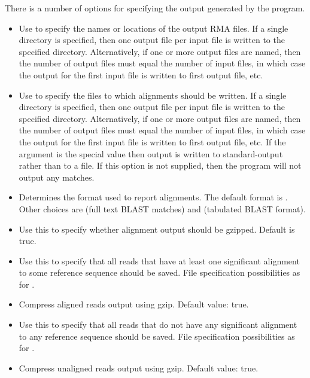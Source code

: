 \documentclass[11pt]{article}
\begin{document}
There is a number of options for specifying the output generated by the program.
\begin{itemize}
\setlength{\itemindent}{30pt}
\item[\itt{--output}]   Use to specify the names or locations of the output RMA files.
	If a single directory is specified, then one output file
per input file is written to the specified directory. Alternatively, if one or more output files are named, then
the number of output files must equal the number of input files, in which case the output for the first
input file is written to first output file, etc. 
\item[\itt{--alignments}]   Use to specify the files to which alignments should be written.
	If a single directory is specified, then one output file
per input file is written to the specified directory. Alternatively, if one or more output files are named, then
the number of output files must equal the number of input files, in which case the output for the first
input file is written to first output file, etc. If the argument is the special value  then output is written
to standard-output rather than to a file. If this option is not supplied, then the program will not output any matches.
\item[\itt{--format}]  Determines the format used to report alignments. The default format is .
	Other choices are  (full text BLAST matches) and  (tabulated BLAST format).
\item[\itt{--gzipOutput}]   Use this to specify whether alignment output should be gzipped. Default is true.
\item[\itt{--outAligned}]        Use this to specify that all reads that have at least one significant alignment to some reference
sequence should be saved. 
File specification possibilities as for .
\item[\itt{--gzipAligned}]                    Compress aligned reads output using gzip. Default value: true.
\item[\itt{--outUnaligned}]      Use this to specify that all reads that do not have any significant alignment to any reference
sequence should be saved.
File specification possibilities as for .
\item[\itt{ --gzipUnaligned}]                  Compress unaligned reads output using gzip. Default value: true.
\end{itemize}
\end{document}
